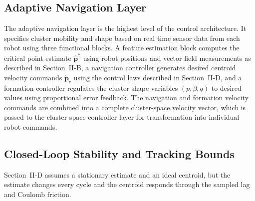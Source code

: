\documentclass[lettersize,journal]{IEEEtran}
\begin{document}
\subsection{Adaptive Navigation Layer}

The adaptive navigation layer is the highest level of the control architecture. It specifies cluster mobility and shape based on real time sensor data from each robot using three functional blocks. A feature estimation block computes the critical point estimate $\hat{\mathbf{p}}^*$ using robot positions and vector field measurements as described in Section~II-B, a navigation controller generates desired centroid velocity commands $\dot{\mathbf{p}}_c$ using the control laws described in Section~II-D, and a formation controller regulates the cluster shape variables $(p, \beta, q)$ to desired values using proportional error feedback. The navigation and formation velocity commands are combined into a complete cluster-space velocity vector, which is passed to the cluster space controller layer for transformation into individual robot commands.

\subsection{Closed-Loop Stability and Tracking Bounds}
\label{sec:stability}

Section~II-D assumes a stationary estimate and an ideal centroid, but the estimate changes every cycle and the centroid responds through the sampled lag and Coulomb friction.
\end{document}
